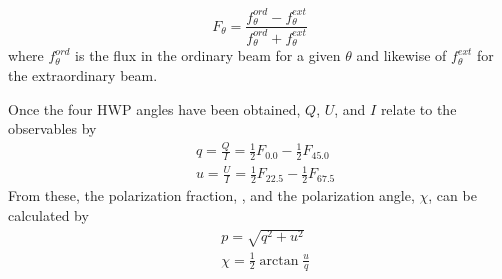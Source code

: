 \begin{equation}\label{eqn:normflux}
F_{\theta}=\frac{f_{\theta}^{ord} - f_{\theta}^{ext} }{f_{\theta}^{ord} + f_{\theta}^{ext}}
\end{equation}
where $f^{ord}_{\theta}$ is the flux in the ordinary beam for a given $\theta$ and likewise of $f^{ext}_{\theta}$ for the extraordinary beam.
 
Once the four HWP angles have been obtained, $Q$, $U$, and $I$ relate to the observables by
\begin{equation}
\begin{aligned}
&q = \frac{Q}{I}= \frac{1}{2}F_{0.0} - \frac{1}{2}F_{45.0} \\
&u = \frac{U}{I}= \frac{1}{2}F_{22.5} - \frac{1}{2}F_{67.5}
\end{aligned}\label{eqn:stokes}
\end{equation}
From these, the polarization fraction, \pol, and the polarization angle, $\chi$, can be calculated by
\begin{equation}
\begin{aligned}
&p = \sqrt{q^2 + u^2} \\
&\chi = \frac{1}{2} \arctan{\frac{u}{q}}
\end{aligned}\label{eqn:pol-angle}
\end{equation}

